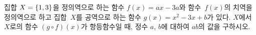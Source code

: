 집합 $X=\{1{,}\mkern3mu\mathopen{}3\}$을 정의역으로 하는 함수 $f(x)=ax-3a$와 함수~$f(x)$의 치역을 정의역으로 하고 집합~$X$를 공역으로 하는 함수 $g(x)=x^2-3x+b$가 있다. $X$에서 $X$로의 함수 $(g\circ f)(x)$가 항등함수일 때, 정수 $a$, $b$에 대하여 $ab$의 값을 구하시오.
